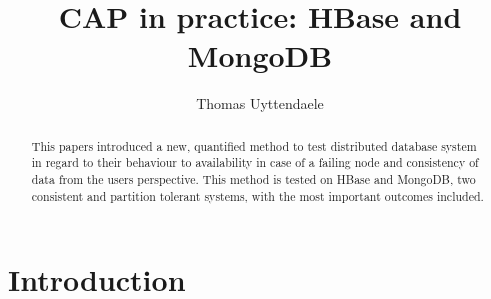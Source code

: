 \documentclass[final,5p,times]{elsarticle}
\begin{document}
\begin{frontmatter}



\title{CAP in practice: HBase and MongoDB}


\author{Thomas Uyttendaele}

\address{}

\begin{abstract}
This papers introduced a new, quantified method to test distributed database system in regard to their behaviour to availability in case of a failing node and consistency of data from the users perspective. This method is tested on HBase and MongoDB, two consistent and partition tolerant systems, with the most important outcomes included. 
\end{abstract}

\begin{keyword}

\end{keyword}

\end{frontmatter}


\section{Introduction}
\end{document}
